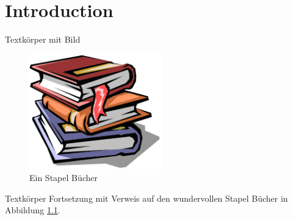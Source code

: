 \chapter{Introduction}
\label{ch:intro}
Textkörper mit Bild

\begin{figure}[htbp]
    \centering
    \includegraphics[height=5cm]{images/buecher.png}
    \caption{Ein Stapel Bücher}
    \label{fig:buecher}
\end{figure}


Textkörper Fortsetzung mit Verweis auf den wundervollen Stapel Bücher in Abbildung \ref{fig:buecher}.




